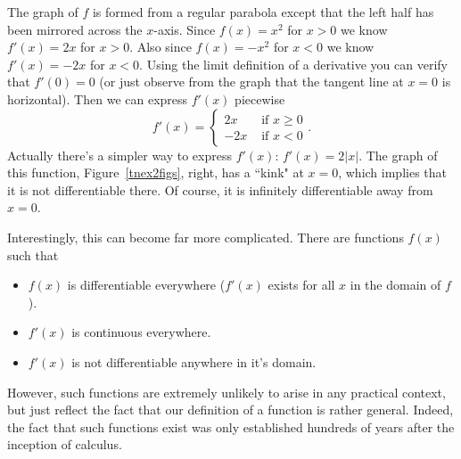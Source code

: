 \begin{bsp}
The graph of $f$ is formed from a regular parabola except that the left half
has been mirrored across the $x$-axis. Since $f(x) = x^2$ for $x>0$ we know
$f'(x) = 2x$ for $x>0$. Also since $f(x) = -x^2$ for $x<0$ we know $f'(x) =
-2x$ for $x<0$. Using the limit definition of a derivative you can verify
that $f'(0) = 0$ (or just observe from the graph that the tangent line at
$x=0$ is horizontal). Then we can express $f'(x)$ piecewise
\[f'(x) = \begin{cases}
2x & \text{ if }x \geq 0 \\
-2x & \text{ if }x < 0
\end{cases}.\]
Actually there's a simpler way to express $f'(x)$: $f'(x) = 2|x|$. The graph
of this function, Figure~\ref{tnex2figs}, right,
has a ``kink" at $x=0$, which implies that it is not differentiable there. 
Of course, it is infinitely differentiable away from $x=0$.
\end{bsp}
Interestingly, this can become far more complicated. There are functions $f(x)$ such that
\begin{itemize}
      \item $f(x)$ is differentiable everywhere ($f'(x)$ exists for all $x$ in the domain of $f$).
      \item $f'(x)$ is continuous everywhere.
      \item $f'(x)$ is not differentiable anywhere in it's domain.
\end{itemize}
However, such functions are extremely unlikely to arise in any practical context,
but just reflect the fact that our definition of a function is rather
general. Indeed, the fact that such functions exist was only established
hundreds of years after the inception of calculus.
